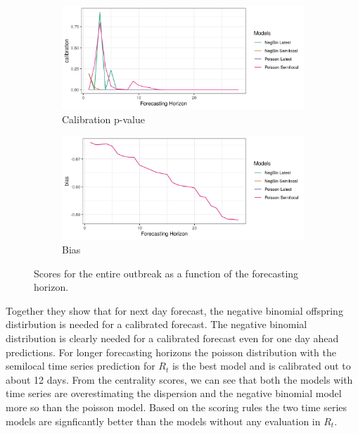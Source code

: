 \documentclass[12pt]{article}
\begin{document}
\begin{figure}[h]
\begin{subfigure}{\textwidth}
  \centering
  \includegraphics[width=0.9\linewidth]{../output/national_calibration.png}  
  \caption{Calibration p-value}
  \label{fig:sub-second}
\end{subfigure}
\begin{subfigure}{\textwidth}
  \centering
  \includegraphics[width=0.9\linewidth]{../output/national_bias.png}  
  \caption{Bias}
  \label{fig:sub-third}
\end{subfigure}
  \caption{Scores for the entire outbreak as a function of the forecasting horizon.}

  \label{fig:nat_scores}
\end{figure}

Together they show that for next day forecast, the negative binomial offspring distirbution is needed for a calibrated forecast. The negative binomial distribution is clearly needed for a calibrated forecast even for one day ahead predictions. For longer forecasting horizons the poisson distribution with the semilocal time series prediction for $R_t$ is the best model and is calibrated out to about 12 days. From the centrality scores, we can see that both the models with time series are overestimating the dispersion and the negative binomial model more so than the poisson model. Based on the scoring rules the two time series models are signficantly better than the models without any evaluation in $R_t$.
\end{document}
